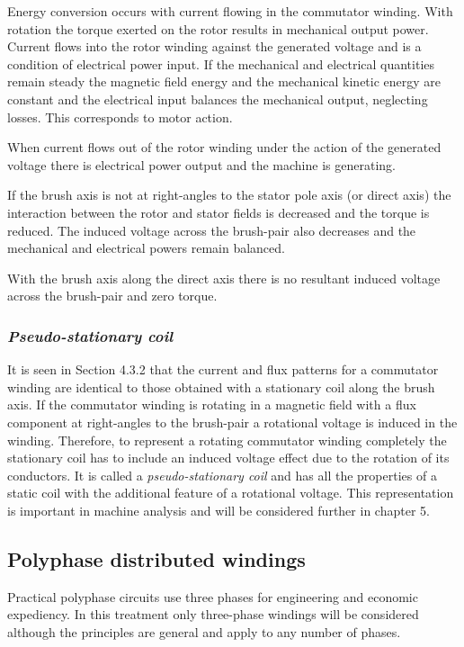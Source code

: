 \documentclass[a4paper,numbers=noenddot,12pt]{scrbook}
\begin{document}
Energy conversion occurs with current flowing in the commutator winding. With rotation the torque exerted on the rotor results in mechanical output power. Current flows into the rotor winding against the generated voltage and is a condition of electrical power input. If the mechanical and electrical quantities remain steady the magnetic field energy and the mechanical kinetic energy are constant and the electrical input balances the mechanical output, neglecting losses. This corresponds to motor action.

When current flows out of the rotor winding under the action of the generated voltage there is electrical power output and the machine is generating. 

If the brush axis is not at right-angles to the stator pole axis (or direct axis) the interaction between the rotor and stator fields is decreased and the torque is reduced. The induced voltage across the brush-pair also decreases and the mechanical and electrical powers remain balanced.

With the brush axis along the direct axis there is no resultant induced voltage across the brush-pair and zero torque.

\subsubsection{\textit{Pseudo-stationary coil}}
It is seen in Section 4.3.2 that the current and flux patterns for a commutator winding are identical to those obtained with a stationary coil along the brush axis. If the commutator winding is rotating in a magnetic field with a flux component at right-angles to the brush-pair a rotational voltage is induced in the winding. Therefore, to represent a rotating commutator winding completely the stationary coil has to include an induced voltage
effect due to the rotation of its conductors. It is called a \textit{pseudo-stationary coil} and has all the properties of a static coil with the additional feature of a rotational voltage. This representation is important in machine analysis and will be considered further in chapter 5.

\subsection{Polyphase distributed windings}
Practical polyphase circuits use three phases for engineering and economic expediency. In this treatment only three-phase windings will be considered although the principles are general and apply to any number of phases.
\end{document}

